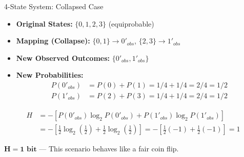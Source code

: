 \documentclass{beamer}
\begin{document}
\begin{frame}{4-State System: Collapsed Case}
    \begin{itemize}
        \item \textbf{Original States:} $\{0, 1, 2, 3\}$ (equiprobable)
        \item \textbf{Mapping (Collapse):}
             $\{0, 1\} \rightarrow 0'_{obs}$,
             $\{2, 3\} \rightarrow 1'_{obs}$
        \item \textbf{New Observed Outcomes:} $\{0'_{obs}, 1'_{obs}\}$
        \item \textbf{New Probabilities:}
            \begin{align*}
                P(0'_{obs}) &= P(0) + P(1) = 1/4 + 1/4 = 2/4 = 1/2 \\
                P(1'_{obs}) &= P(2) + P(3) = 1/4 + 1/4 = 2/4 = 1/2
            \end{align*}
    \end{itemize}
    \pause
        \begin{align*}
            H &= - \left[ P(0'_{obs}) \log_2 P(0'_{obs}) + P(1'_{obs}) \log_2 P(1'_{obs}) \right] \\
            &= - \left[ \frac{1}{2} \log_2 \left(\frac{1}{2}\right) + \frac{1}{2} \log_2 \left(\frac{1}{2}\right) \right]
             = - \left[ \frac{1}{2}(-1) + \frac{1}{2}(-1) \right] =1
        \end{align*}

            $\boldsymbol{H = 1 \text{ bit}}$
        ---
        \alert{This scenario behaves like a fair coin flip.}
\end{frame}
\end{document}
